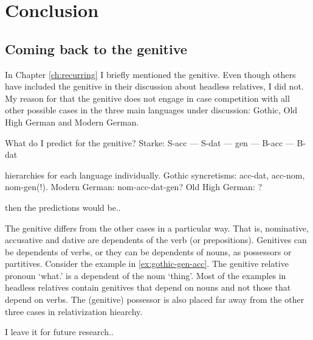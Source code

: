 
\chapter{Conclusion}


\section{Coming back to the genitive}


In Chapter \ref{ch:recurring} I briefly mentioned the genitive. Even though others \citep[cf.][]{harbert1978,pittner1995} have included the genitive in their discussion about headless relatives, I did not. My reason for that the genitive does not engage in case competition with all other possible cases in the three main languages under discussion: Gothic, Old High German and Modern German.

What do I predict for the genitive? Starke: S-acc --- S-dat --- gen --- B-acc --- B-dat

hierarchies for each language individually. Gothic syncretisms: acc-dat, acc-nom, nom-gen(!). Modern German: nom-acc-dat-gen? Old High German: ?

then the predictions would be..

The genitive differs from the other cases in a particular way. That is, nominative, accusative and dative are dependents of the verb (or prepositions). Genitives can be dependents of verbs, or they can be dependents of nouns, as possessors or partitives. Consider the example in \ref{ex:gothic-gen-acc}. The genitive relative pronoun  `what.' is a dependent of the noun  `thing'. Most of the examples in headless relatives contain genitives that depend on nouns and not those that depend on verbs. The (genitive) possessor is also placed far away from the other three cases in  relativization hiearchy.

I leave it for future research..     
